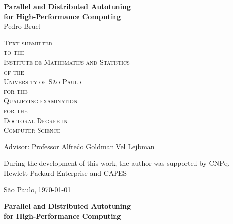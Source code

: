 \documentclass[12pt,twoside,a4paper]{book}
\begin{document}
\frontmatter
\setcounter{tocdepth}{2}

\onehalfspacing  %

\thispagestyle{empty}
\begin{center}
    \vspace*{2.3cm}
    \textbf{\Large{Parallel and Distributed Autotuning \\
                   for High-Performance Computing}}\\

    \vspace*{1.2cm}
    \Large{Pedro Bruel}

    \vskip 2cm
    \textsc{
    Text submitted\\[-0.25cm]
    to the\\[-0.25cm]
    Institute de Mathematics and Statistics\\[-0.25cm]
    of the\\[-0.25cm]
    University of São Paulo\\[-0.25cm]
    for the\\[-0.25cm]
    Qualifying examination\\[-0.25cm]
    for the\\[-0.25cm]
    Doctoral Degree in\\[-0.25cm]
    Computer Science}

    \vskip 1.5cm
    Advisor: Professor Alfredo Goldman Vel Lejbman

       \vskip 1cm
    \normalsize{During the development of this work, the author was supported
    by CNPq, Hewlett-Packard Enterprise and CAPES}

    \vskip 0.5cm
    \normalsize{São Paulo, \today}
\end{center}

%
%
%
\newpage
\thispagestyle{empty}
    \begin{center}
        \vspace*{2.3 cm}
        \textbf{\Large{Parallel and Distributed Autotuning\\
                       for High-Performance Computing}}\\
        \vspace*{2 cm}
    \end{center}
\end{document}
